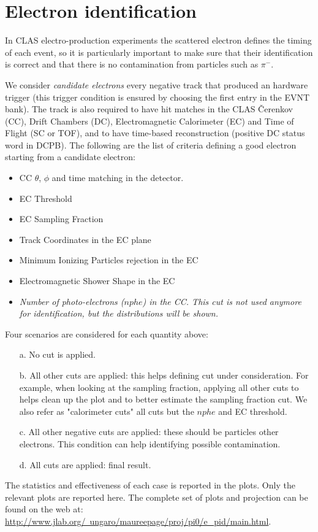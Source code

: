 \clearpage\newpage
\section{Electron identification}

In CLAS electro-production experiments
the scattered electron defines the timing of each event,
so it is particularly important to
make sure that their identification is correct and that
there is no contamination from particles such as $\pi^-$.

We consider {\it candidate electrons} every negative track
that produced an hardware trigger (this trigger condition is ensured by choosing
the first entry in the EVNT bank). The track is also required to have
hit matches in the CLAS \v Cerenkov (CC)\cite{bib:cc}, Drift Chambers (DC)\cite{bib:dc},
Electromagnetic Calorimeter (EC)\cite{bib:ec} and Time of Flight (SC or TOF)\cite{bib:ftof},
and to have time-based reconstruction (positive DC status word in DCPB).
The following are the list of criteria defining a good electron
starting from a candidate electron:

\begin{itemize}
	\item CC $\theta$, $\phi$ and time matching in the  detector.
	\item EC Threshold 
	\item EC Sampling Fraction 
	\item Track Coordinates in the EC plane 
	\item Minimum Ionizing Particles rejection in the EC
	\item Electromagnetic Shower Shape in the EC
	\item {\it Number of photo-electrons ($nphe$) in the CC.
              This cut is not used anymore for identification,
              but the distributions will be shown. }
\end{itemize}

Four scenarios are considered for each quantity above:

\begin{itemize}  
	\item[a.] No cut is applied.
	\item[b.] All other cuts are applied: this helps defining cut under consideration.
	      For example, when looking at the sampling fraction, applying all other
	      cuts to helps clean up the plot and to better estimate the sampling fraction
	      cut. We also refer as "calorimeter cuts" all cuts but the $nphe$ and EC threshold.
	\item[c.] All other negative cuts are applied: these should be particles other electrons. This
	      condition can help identifying possible contamination.
	\item[d.] All cuts are applied: final result.
\end{itemize}
The statistics and effectiveness of each case is reported in the plots.
Only the relevant plots are reported here. The complete set of plots and projection can
be found on the web at: \href{http://www.jlab.org/~ungaro/maureepage/proj/pi0/e_pid/main.html}
{http://www.jlab.org/~ungaro/maureepage/proj/pi0/e\_pid/main.html}.

